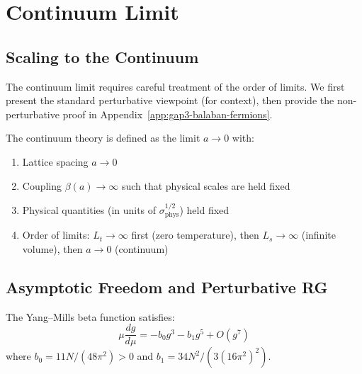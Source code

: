 \section{Continuum Limit}
\label{sec:continuum}

\subsection{Scaling to the Continuum}

The continuum limit requires careful treatment of the order of limits. We 
first present the standard perturbative viewpoint (for context), then provide 
the non-perturbative proof in Appendix~\ref{app:gap3-balaban-fermions}.

\begin{definition}
The continuum theory is defined as the limit $a \to 0$ with:
\begin{enumerate}[label=(\roman*)]
\item Lattice spacing $a \to 0$
\item Coupling $\beta(a) \to \infty$ such that physical scales are held fixed
\item Physical quantities (in units of $\sigma_{\text{phys}}^{1/2}$) held fixed
\item Order of limits: $L_t \to \infty$ first (zero temperature), then $L_s \to \infty$ 
(infinite volume), then $a \to 0$ (continuum)
\end{enumerate}
\end{definition}

\subsection{Asymptotic Freedom and Perturbative RG}

\begin{theorem}
\label{thm:asymptotic-freedom-sec11_continuum_limit}
The Yang--Mills beta function satisfies:
\[
\mu \frac{dg}{d\mu} = -b_0 g^3 - b_1 g^5 + O(g^7)
\]
where $b_0 = 11N/(48\pi^2) > 0$ and $b_1 = 34N^2/(3(16\pi^2)^2)$.
\end{theorem}


